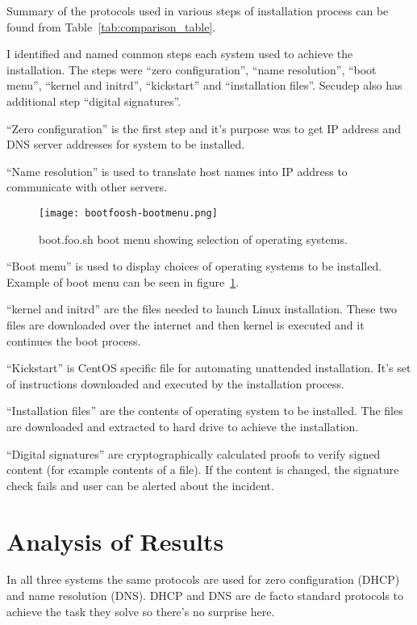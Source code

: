Summary of the protocols used in various steps of installation process
can be found from Table~\ref{tab:comparison_table}.

I identified and named common steps each system used to achieve the
installation. The steps were ``zero configuration'', ``name
resolution'', ``boot menu'', ``kernel and initrd'', ``kickstart'' and
``installation files''. Secudep also has additional step ``digital
signatures''.

``Zero configuration'' is the first step and it's purpose was to get
IP address and DNS server addresses for system to be installed.

``Name resolution'' is used to translate host names into IP address to
communicate with other servers.

\begin{figure}[h]
  \texttt{[image: bootfoosh-bootmenu.png]}
  \caption{boot.foo.sh boot menu showing selection of operating
    systems.\label{fig:bootmenu}}
\end{figure}

``Boot menu'' is used to display choices of operating systems to be
installed. Example of boot menu can be seen in figure~\ref{fig:bootmenu}.

``kernel and initrd'' are the files needed to launch Linux
installation. These two files are downloaded over the internet and
then kernel is executed and it continues the boot process.

``Kickstart'' is CentOS specific file for automating unattended
installation. It's set of instructions downloaded and executed by the
installation process.

``Installation files'' are the contents of operating system to be
installed. The files are downloaded and extracted to hard drive to
achieve the installation.

``Digital signatures'' are cryptographically calculated proofs to
verify signed content (for example contents of a file). If the content
is changed, the signature check fails and user can be alerted about
the incident.

\section{Analysis of Results}

In all three systems the same protocols are used for zero
configuration (DHCP) and name resolution (DNS). DHCP and DNS are de
facto standard protocols to achieve the task they solve so there's no
surprise here.

